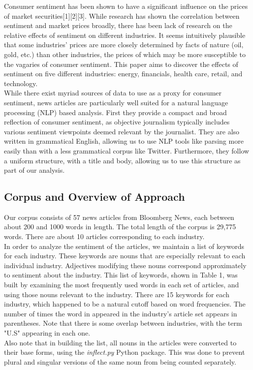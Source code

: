 \documentclass[pageno]{jpaper}
\begin{document}
\indent Consumer sentiment has been shown to have a significant influence on the prices of market securities[1][2][3]. While research has shown the correlation between sentiment and market prices broadly, there has been lack of research on the relative effects of sentiment on different industries. It seems intuitively plausible that some industries' prices are more closely determined by facts of nature (oil, gold, etc.) than other industries, the prices of which may be more susceptible to the vagaries of consumer sentiment. This paper aims to discover the effects of sentiment on five different industries: energy, financials, health care, retail, and technology. \\
\indent While there exist myriad sources of data to use as a proxy for consumer sentiment, news articles are particularly well suited for a natural language processing (NLP) based analysis. First they provide a compact and broad reflection of consumer sentiment, as objective journalism typically includes various sentiment viewpoints deemed relevant by the journalist. They are also written in grammatical English, allowing us to use NLP tools like parsing more easily than with a less grammatical corpus like Twitter. Furthermore, they follow a uniform structure, with a title and body, allowing us to use this structure as part of our analysis.
\subsection{Corpus and Overview of Approach}
\indent Our corpus consists of 57 news articles from Bloomberg News, each between about 200 and 1000 words in length. The total length of the corpus is 29,775 words. There are about 10 articles corresponding to each industry. \\
\indent In order to analyze the sentiment of the articles, we maintain a list of keywords for each industry. These keywords are nouns that are especially relevant to each individual industry. Adjectives modifying these nouns correspond approximately to sentiment about the industry. This list of keywords, shown in Table 1, was built by examining the most frequently used words in each set of articles, and using those nouns relevant to the industry. There are 15 keywords for each industry, which happened to be a natural cutoff based on word frequencies. The number of times the word in appeared in the industry's article set appears in parentheses. Note that there is some overlap between industries, with the term "U.S" appearing in  each one. \\
\indent Also note that in building the list, all nouns in the articles were converted to their base forms, using the \textit{inflect.py} Python package. This was done to prevent plural and singular versions of the same noun from being counted separately.
\end{document}
